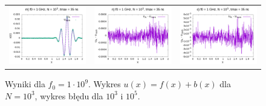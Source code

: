 \documentclass[11pt,a4paper]{report}
\begin{document}
\begin{figure}
\begin{tabular}{ccc}
\includegraphics[width=55mm]{plots/1/mc1_3_35} &   \includegraphics[width=55mm]{plots/1/mc1_3_35_dif} &   \includegraphics[width=55mm]{plots/1/mc1_5_35_dif} \\
\end{tabular}
\caption{Wyniki dla $f_0 = 1 \cdot 10^9$. Wykres $u(x) = f(x)+b(x)$ dla $N = 10^3$, wykres błędu dla $10^3$ i $10^5$.}
\end{figure}
\newpage
\end{document}

